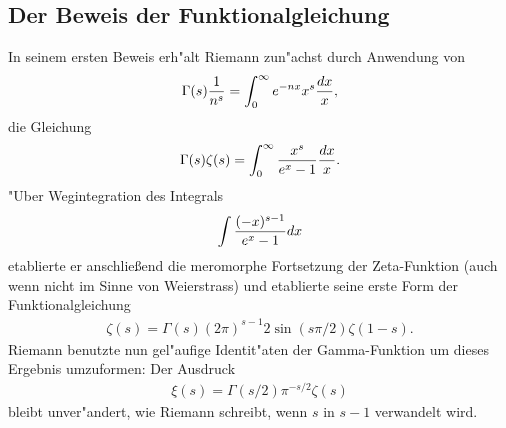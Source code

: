 \subsection{Der Beweis der Funktionalgleichung}
	In seinem ersten Beweis erh"alt Riemann zun"achst durch Anwendung von
	\begin{align}\label{eq:riemannstart}
		\Gamma(s)\frac{1}{n^s} = \int_0^\infty e^{-nx}x^{s}\frac{d{x}}{x},
	\end{align}
	die Gleichung
	\begin{align*}
		\Gamma(s)\zeta(s) = \int_0^\infty \frac{x^{s}}{e^x-1} \frac{d{x}}{x}.
	\end{align*}
	"Uber Wegintegration des Integrals
	\begin{align*}
		\int \frac{(-x)^{s-1}}{e^x-1}d{x}
	\end{align*}
	etablierte er anschließend die meromorphe Fortsetzung der Zeta-Funktion (auch wenn nicht im Sinne von Weierstrass) und etablierte seine erste Form der Funktionalgleichung
	\begin{align*}
		\zeta(s) = \Gamma(s)(2\pi)^{s-1} 2 \sin(s\pi/2) \zeta(1-s).
	\end{align*}
	Riemann benutzte nun gel"aufige Identit"aten der Gamma-Funktion um dieses Ergebnis umzuformen:
	Der Ausdruck
	\begin{align*}
		\xi(s) = \Gamma(s/2)\pi^{-s/2}\zeta(s)
	\end{align*}
	bleibt unver"andert, wie Riemann schreibt, \glqq wenn $s$ in $s-1$ verwandelt wird.\grqq{}
	
